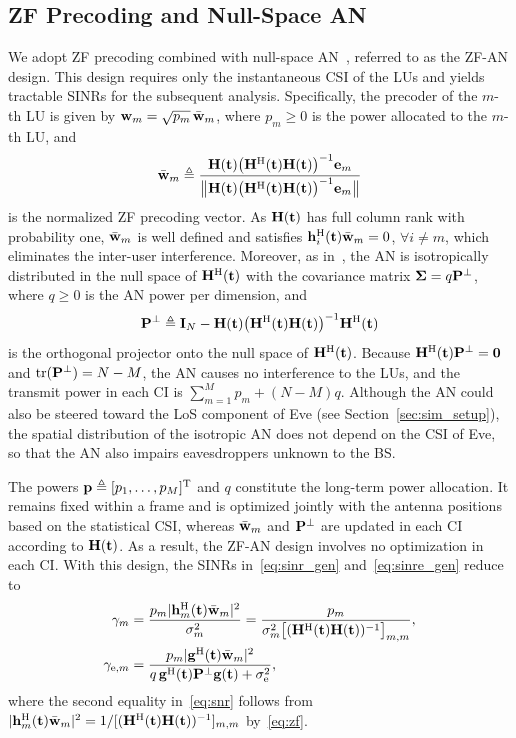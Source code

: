 \documentclass[journal]{IEEEtran}
\newcommand{\rev}[1]{{\color{red}#1}}
\newcommand{\rev}[1]{#1}
\begin{document}
\subsection{ZF Precoding and Null-Space AN}\label{sec:zfan}

We adopt ZF precoding combined with null-space AN~\cite{Zhou2010,ZhuTWC2014}, referred to as the ZF-AN design. This design requires only the instantaneous CSI of the LUs and yields tractable SINRs for the subsequent analysis. Specifically, the precoder of the $m$-th LU is given by $\mathbf{w}_m=\sqrt{p_m}\,\bar{\mathbf{w}}_m$, where $p_m\ge0$ is the power allocated to the $m$-th LU, and
\begin{equation}\label{eq:zf}
\bar{\mathbf{w}}_m\triangleq\frac{\mathbf{H}(\mathbf{t})\big(\mathbf{H}^{\mathrm H}(\mathbf{t})\mathbf{H}(\mathbf{t})\big)^{-1}\mathbf{e}_m}{\big\|\mathbf{H}(\mathbf{t})\big(\mathbf{H}^{\mathrm H}(\mathbf{t})\mathbf{H}(\mathbf{t})\big)^{-1}\mathbf{e}_m\big\|}
\end{equation}
is the normalized ZF precoding vector. As $\mathbf{H}(\mathbf{t})$ has full column rank with probability one, $\bar{\mathbf{w}}_m$ is well defined and satisfies $\mathbf{h}_i^{\mathrm H}(\mathbf{t})\bar{\mathbf{w}}_m=0$, $\forall i\neq m$, which eliminates the inter-user interference. Moreover, as in~\cite{Zhou2010,ZhuTWC2014}, the AN is isotropically distributed in the null space of $\mathbf{H}^{\mathrm H}(\mathbf{t})$ with the covariance matrix $\boldsymbol{\Sigma}=q\mathbf{P}^{\perp}$, where $q\ge0$ is the AN power per dimension, and
\begin{equation}\label{eq:an}
\mathbf{P}^{\perp}\triangleq\mathbf{I}_N-\mathbf{H}(\mathbf{t})\big(\mathbf{H}^{\mathrm H}(\mathbf{t})\mathbf{H}(\mathbf{t})\big)^{-1}\mathbf{H}^{\mathrm H}(\mathbf{t})
\end{equation}
is the orthogonal projector onto the null space of $\mathbf{H}^{\mathrm H}(\mathbf{t})$. Because $\mathbf{H}^{\mathrm H}(\mathbf{t})\mathbf{P}^{\perp}=\mathbf 0$ and $\mathrm{tr}(\mathbf{P}^{\perp})=N-M$, the AN causes no interference to the LUs, and the transmit power in each CI is $\sum_{m=1}^Mp_m+(N-M)q$. Although the AN could also be steered toward the LoS component of Eve (see Section~\ref{sec:sim_setup}), \rev{the spatial distribution of the isotropic AN does not depend on the CSI of Eve, so that the AN} also impairs eavesdroppers unknown to the BS.

The powers $\mathbf{p}\triangleq[p_1,\ldots,p_M]^{\mathrm T}$ and $q$ constitute the long-term power allocation. It remains fixed within a frame and is optimized jointly with the antenna positions based on the statistical CSI, whereas $\bar{\mathbf{w}}_m$ and $\mathbf{P}^{\perp}$ are updated in each CI according to $\mathbf{H}(\mathbf{t})$. As a result, the ZF-AN design involves no optimization in each CI. With this design, the SINRs in~\eqref{eq:sinr_gen} and~\eqref{eq:sinre_gen} reduce to
\begin{align}
\gamma_m&=\frac{p_m|\mathbf{h}_m^{\mathrm H}(\mathbf{t})\bar{\mathbf{w}}_m|^2}{\sigma_m^2}=\frac{p_m}{\sigma_m^2\big[(\mathbf{H}^{\mathrm H}(\mathbf{t})\mathbf{H}(\mathbf{t}))^{-1}\big]_{m,m}},\label{eq:snr}\\
\gamma_{\mathrm{e},m}&=\frac{p_m|\mathbf{g}^{\mathrm H}(\mathbf{t})\bar{\mathbf{w}}_m|^2}{q\,\mathbf{g}^{\mathrm H}(\mathbf{t})\mathbf{P}^{\perp}\mathbf{g}(\mathbf{t})+\sigma_{\mathrm e}^2},\label{eq:sinre}
\end{align}
where the second equality in~\eqref{eq:snr} follows from $|\mathbf{h}_m^{\mathrm H}(\mathbf{t})\bar{\mathbf{w}}_m|^2=1/[(\mathbf{H}^{\mathrm H}(\mathbf{t})\mathbf{H}(\mathbf{t}))^{-1}]_{m,m}$ by~\eqref{eq:zf}.
\end{document}
